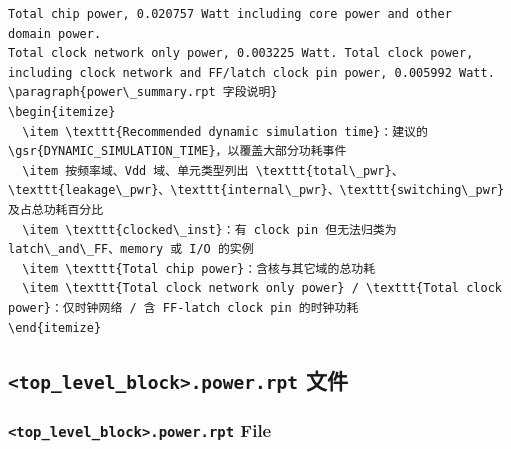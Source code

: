 \begin{lstlisting}
Total chip power, 0.020757 Watt including core power and other
domain power.
Total clock network only power, 0.003225 Watt. Total clock power,
including clock network and FF/latch clock pin power, 0.005992 Watt.
\paragraph{power\_summary.rpt 字段说明}
\begin{itemize}
  \item \texttt{Recommended dynamic simulation time}：建议的 \gsr{DYNAMIC_SIMULATION_TIME}，以覆盖大部分功耗事件
  \item 按频率域、Vdd 域、单元类型列出 \texttt{total\_pwr}、\texttt{leakage\_pwr}、\texttt{internal\_pwr}、\texttt{switching\_pwr} 及占总功耗百分比
  \item \texttt{clocked\_inst}：有 clock pin 但无法归类为 latch\_and\_FF、memory 或 I/O 的实例
  \item \texttt{Total chip power}：含核与其它域的总功耗
  \item \texttt{Total clock network only power} / \texttt{Total clock power}：仅时钟网络 / 含 FF-latch clock pin 的时钟功耗
\end{itemize}

\end{lstlisting}

\subsection{\texttt{<top\_level\_block>.power.rpt} 文件}
\subsubsection*{\texttt{<top\_level\_block>.power.rpt} File}

